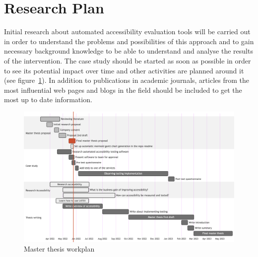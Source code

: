 \documentclass{thesis_proposal}
\begin{document}
\section{Research Plan}
Initial research about automated accessibility evaluation tools will be carried out in order to understand the problems and possibilities of this approach and to gain necessary background knowledge to be able to understand and analyse the results of the intervention.
The case study should be started as soon as possible in order to see its potential impact over time and other activities are planned around it (see figure~\ref{fig:plan}).
In addition to publications in academic journals, articles from the most influential web pages and blogs in the field should be included to get the most up to date information.
\begin{figure}[ht!]
	\includegraphics[width=1\textwidth]{img/timeline.png}
	\caption{Master thesis workplan}\label{fig:plan}
\end{figure}

\pagebreak
\printbibliography{}
\nocite{*}
\end{document}
